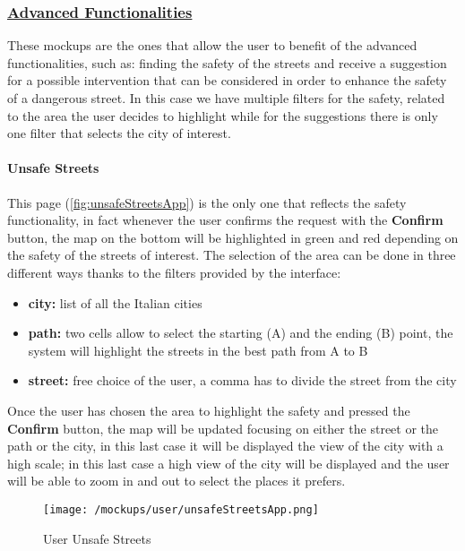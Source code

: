 		\subsubsection[Advanced Functionalities]{\hyperlink{toc}{Advanced Functionalities}}
			\label{sec:userAdvancedFunctionalities}
			
			These mockups are the ones that allow the user to benefit of the advanced functionalities, such as: finding the safety of the streets and receive a suggestion for a possible intervention that can be considered in order to enhance the safety of a dangerous street. In this case we have multiple filters for the safety, related to the area the user decides to highlight while for the suggestions there is only one filter that selects the city of interest.
			
			\paragraph{Unsafe Streets}
			This page (\autoref{fig:unsafeStreetsApp}) is the only one that reflects the safety functionality, in fact whenever the user confirms the request with the \textbf{Confirm}
			button, the map on the bottom will be highlighted in green and red depending on the safety of the streets of interest. The selection of the area can be done in three different ways thanks to the filters provided by the interface:
			
			\begin{itemize}
				\item \textbf{city:} list of all the Italian cities
				\item \textbf{path:} two cells allow to select the starting (A) and the ending (B) point, the system will highlight the streets in the best path from A to B
				\item \textbf{street:} free choice of the user, a comma has to divide the street from the city
			\end{itemize}
		
			Once the user has chosen the area to highlight the safety and pressed the \textbf{Confirm} button, the map will be updated focusing on either the street or the path or the city, in this last case it will be displayed the view of the city with a high scale; in this last case a high view of the city will be displayed and the user will be able to zoom in and out to select the places it prefers.
			
			\begin{figure}[ht!]
				\centering
				\texttt{[image: /mockups/user/unsafeStreetsApp.png]}
				\caption{\label{fig:unsafeStreetsApp} User Unsafe Streets}
			\end{figure}
		
